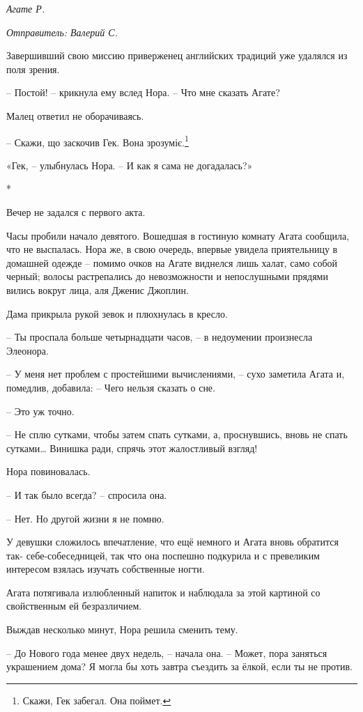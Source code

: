 \documentclass[
  a5paperpaper,
  DIV=11,
  numbers=noendperiod]{scrreprt}
\begin{document}
\emph{Агате Р.}

\emph{Отправитель: Валерий С.}

Завершивший свою миссию приверженец английских традиций уже удалялся из
поля зрения.

-- Постой! -- крикнула ему вслед Нора. -- Что мне сказать Агате?

Малец ответил не оборачиваясь.

-- Скажи, що заскочив Гек. Вона зрозуміє.\footnote{Скажи, Гек забегал.
  Она поймет.}

«Гек, -- улыбнулась Нора. -- И как я сама не догадалась?»

*

Вечер не задался с первого акта.

Часы пробили начало девятого. Вошедшая в гостиную комнату Агата
сообщила, что не выспалась. Нора же, в свою очередь, впервые увидела
приятельницу в домашней одежде -- помимо очков на Агате виднелся лишь
халат, само собой черный; волосы растрепались до невозможности и
непослушными прядями вились вокруг лица, аля Дженис Джоплин.

Дама прикрыла рукой зевок и плюхнулась в кресло.

-- Ты проспала больше четырнадцати часов, -- в недоумении произнесла
Элеонора.

-- У меня нет проблем с простейшими вычислениями, -- сухо заметила Агата
и, помедлив, добавила: -- Чего нельзя сказать о сне.

-- Это уж точно.

-- Не сплю сутками, чтобы затем спать сутками, а, проснувшись, вновь не
спать сутками\ldots{} Винишка ради, спрячь этот жалостливый взгляд!

Нора повиновалась.

-- И так было всегда? -- спросила она.

-- Нет. Но другой жизни я не помню.

У девушки сложилось впечатление, что ещё немного и Агата вновь обратится
так- себе-собеседницей, так что она поспешно подкурила и с превеликим
интересом взялась изучать собственные ногти.

Агата потягивала излюбленный напиток и наблюдала за этой картиной со
свойственным ей безразличием.

Выждав несколько минут, Нора решила сменить тему.

-- До Нового года менее двух недель, -- начала она. -- Может, пора
заняться украшением дома? Я могла бы хоть завтра съездить за ёлкой, если
ты не против.
\end{document}
